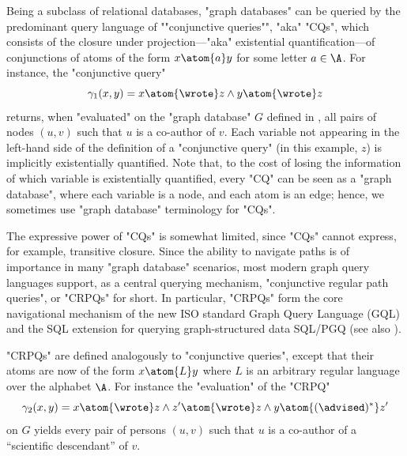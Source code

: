 \AP Being a subclass of relational databases, "graph databases" can be queried by the
predominant query language of ""conjunctive queries"", "aka" "CQs", 
which consists of the closure under projection---"aka" existential quantification---of conjunctions of atoms of the form $x \atom{a} y$
for some letter $a \in \A$. For instance, the "conjunctive query"
\[
    \gamma_1(x, y) = x \atom{\wrote} z
        \land y \atom{\wrote} z    
\]
returns, when "evaluated" on the "graph database" $G$
defined in , all pairs of nodes $(u, v)$ such that $u$ is a co-author
of $v$. Each variable not appearing in the left-hand side of 
the definition of a "conjunctive query" (in this example, $z$) is implicitly 
existentially quantified. 
Note that, to the cost of losing the information of which variable is existentially quantified, every "CQ"
can be seen as a "graph database", where each variable is a node, and each atom is an edge; 
hence, we sometimes use "graph database" terminology for "CQs".

The expressive power of "CQs" is somewhat limited, since
"CQs" cannot express, for example, transitive closure.
Since the ability to navigate paths is of importance in many "graph database" 
scenarios, most modern graph query languages support, as a central querying mechanism,
"conjunctive regular path queries", or "CRPQs" for short. 
In particular, "CRPQs" form the core navigational mechanism of the new ISO standard Graph Query Language (GQL) \cite{ISO2024GQL} and the SQL extension for querying graph-structured data SQL/PGQ \cite{ISO2023PGQ} (see also \cite{FrancisEtal2023GQL,FrancisEtal2023GPC}).

"CRPQs" are 
defined analogously to "conjunctive queries", except that their atoms are now of the form 
$x \atom{L} y$ where $L$ is an arbitrary regular language over the alphabet $\A$. For 
instance the "evaluation" of the "CRPQ"
\[
    \gamma_2(x, y) = x \atom{\wrote} z
        \land z' \atom{\wrote} z 
        \land y \atom{({\advised})^*} z'
\]
on $G$ yields every pair of persons $(u,v)$ such that $u$ is a co-author of a
``scientific descendant'' of $v$. 

